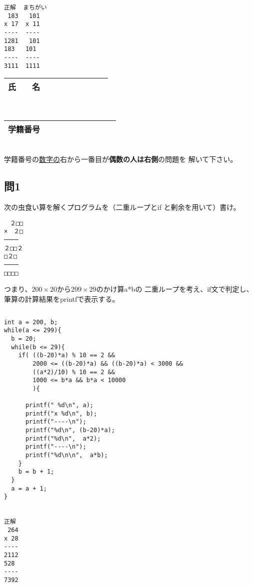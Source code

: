 \documentclass[a4j]{jarticle}
\begin{document}
\begin{multicols*}{2}
\begin{verbatim}
正解  まちがい
 183   101
x 17  x 11
----  ----
1281   101
183   101
----  ----
3111  1111
\end{verbatim}
\vspace{4cm}
\mbox{}
\fi








\noindent
\begin{tabular}[t]{|c|cccccccc|}\hline
氏　　名 & & & & & & & & \\ \hline
\end{tabular}\\
\begin{tabular}[t]{|c|c|c|c|c|c|c|c|c|c|}\hline
学籍番号 & & & & & & & & \\ \hline
\end{tabular}\\
学籍番号の\underline{数字の}右から一番目が{\bfseries 偶数の人は右側}の問題を
解いて下さい。
\vspace{-5ex}









\subsection*{問1}

次の虫食い算を解くプログラムを（二重ループと{\ttfamily if}
と剰余を用いて）書け。
\begin{verbatim}
　２□□
×　２□
────
２□□２
□２□
────
□□□□
\end{verbatim}
つまり、$200\times20$から$299\times29$のかけ算{\ttfamily a*b}の
二重ループを考え、{\ttfamily if}文で判定し、
筆算の計算結果を{\ttfamily printf}で表示する。


\ifnum {}
\begin{verbatim}

\end{verbatim}
\vspace{5cm}
\else
\begin{verbatim}
int a = 200, b;
while(a <= 299){
  b = 20;
  while(b <= 29){
    if( ((b-20)*a) % 10 == 2 &&
        2000 <= ((b-20)*a) && ((b-20)*a) < 3000 &&
        ((a*2)/10) % 10 == 2 &&
        1000 <= b*a && b*a < 10000
        ){

      printf(" %d\n", a);
      printf("x %d\n", b);
      printf("----\n");
      printf("%d\n", (b-20)*a);
      printf("%d\n",  a*2);
      printf("----\n");
      printf("%d\n\n",  a*b);
    }
    b = b + 1;
  }
  a = a + 1;
}


正解
 264
x 28
----
2112
528
----
7392
\end{verbatim}
\fi









\end{multicols*}
\end{document}
